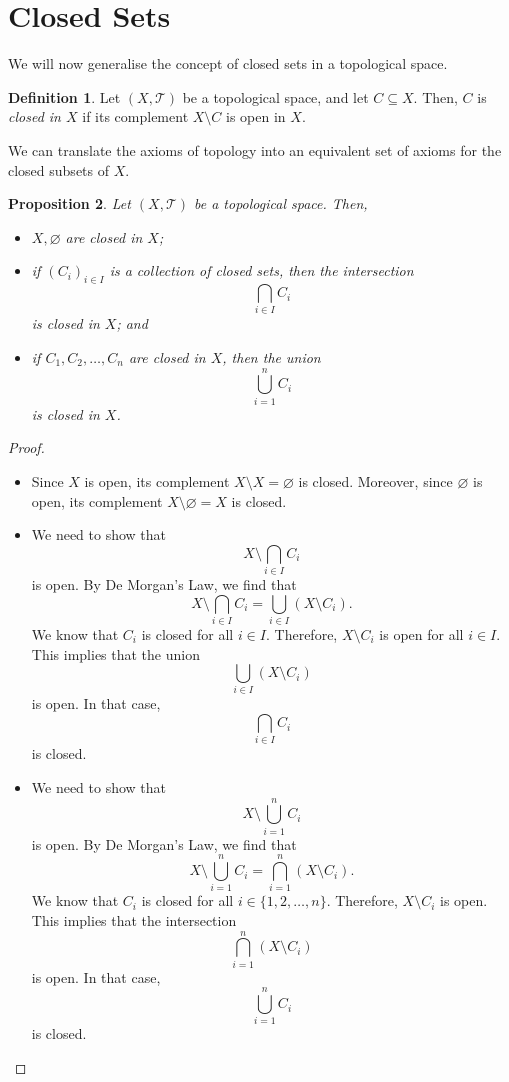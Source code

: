 \documentclass[a4paper, openany]{memoir}
\theoremstyle{definition}
\newtheorem{definition}{Definition}[section]
\theoremstyle{plain}
\newtheorem{proposition}[definition]{Proposition}
\begin{document}
\section{Closed Sets}
We will now generalise the concept of closed sets in a topological space.
\begin{definition}
Let $(X, \mathcal{T})$ be a topological space, and let $C \subseteq X$. Then, $C$ is \emph{closed in $X$} if its complement $X \setminus C$ is open in $X$.
\end{definition}
\noindent We can translate the axioms of topology into an equivalent set of axioms for the closed subsets of $X$.
\begin{proposition}
Let $(X, \mathcal{T})$ be a topological space. Then,
\begin{itemize}
    \item $X, \varnothing$ are closed in $X$;
    \item if $(C_i)_{i\in I}$ is a collection of closed sets, then the intersection
    \[\bigcap_{i \in I} C_i\]
    is closed in $X$; and
    \item if $C_1, C_2, \dots, C_n$ are closed in $X$, then the union
    \[\bigcup_{i =1}^n C_i\]
    is closed in $X$.
\end{itemize}
\end{proposition}
\begin{proof}
\hspace*{0pt}
\begin{itemize}
    \item Since $X$ is open, its complement $X \setminus X = \varnothing$ is closed. Moreover, since $\varnothing$ is open, its complement $X \setminus \varnothing = X$ is closed.
    
    \item We need to show that
    \[X \setminus \bigcap_{i \in I} C_i\]
    is open. By De Morgan's Law, we find that
    \[X \setminus \bigcap_{i \in I} C_i = \bigcup_{i \in I} (X \setminus C_i).\]
    We know that $C_i$ is closed for all $i \in I$. Therefore, $X \setminus C_i$ is open for all $i \in I$. This implies that the union
    \[\bigcup_{i \in I} (X \setminus C_i)\]
    is open. In that case,
    \[\bigcap_{i \in I} C_i\]
    is closed.
    
    \item We need to show that
    \[X \setminus \bigcup_{i=1}^n C_i\]
    is open. By De Morgan's Law, we find that
    \[X \setminus \bigcup_{i=1}^n C_i = \bigcap_{i=1}^n (X \setminus C_i).\]
    We know that $C_i$ is closed for all $i \in \{1, 2, \dots, n\}$. Therefore, $X \setminus C_i$ is open. This implies that the intersection
    \[\bigcap_{i=1}^n (X \setminus C_i)\]
    is open. In that case,
    \[\bigcup_{i=1}^n C_i\]
    is closed.
\end{itemize}
\end{proof}
\end{document}
